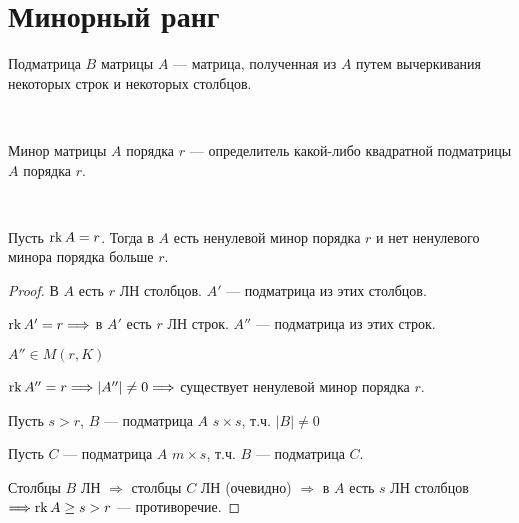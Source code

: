 
\section{Минорный ранг}

\begin{conj} 
    Подматрица $B$ матрицы $A$ --- матрица, полученная из $A$ путем вычеркивания некоторых строк и некоторых столбцов.
\end{conj}
\
\begin{conj} 
    Минор матрицы $A$ порядка $r$ --- определитель какой-либо квадратной подматрицы $A$ порядка $r$.
\end{conj}
\
\begin{theorem-non} 
    
    Пусть $\operatorname{rk} A = r$. Тогда в $A$ есть ненулевой минор порядка $r$ и нет ненулевого минора порядка больше $r$.

    \begin{proof}
        
        В $A$ есть $r$ ЛН столбцов. $A'$ --- подматрица из этих столбцов.

        $\operatorname{rk} A' = r \Longrightarrow$ в $A'$ есть $r$ ЛН строк. $A''$ --- подматрица из этих строк.

        $A'' \in M(r, K)$

        $\operatorname{rk} A'' = r \Longrightarrow |A''| \neq 0 \Longrightarrow$ существует ненулевой минор порядка $r$.

        Пусть $s > r$, $B$ --- подматрица $A$ $s \times s$, т.ч. $|B| \neq 0$

        Пусть $C$ --- подматрица $A$ $m \times s$, т.ч. $B$ --- подматрица $C$.

        Столбцы $B$ ЛН $\Longrightarrow$ столбцы $C$ ЛН (очевидно) $\Longrightarrow$ в $A$ есть $s$ ЛН столбцов $\Longrightarrow \operatorname{rk} A \geq s > r$ --- противоречие.

    \end{proof}

\end{theorem-non}

